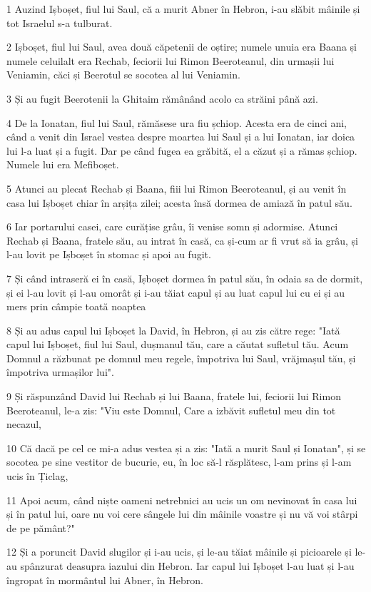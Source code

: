 \par 1 Auzind Ișboșet, fiul lui Saul, că a murit Abner în Hebron, i-au slăbit mâinile și tot Israelul s-a tulburat.
\par 2 Ișboșet, fiul lui Saul, avea două căpetenii de oștire; numele unuia era Baana și numele celuilalt era Rechab, feciorii lui Rimon Beeroteanul, din urmașii lui Veniamin, căci și Beerotul se socotea al lui Veniamin.
\par 3 Și au fugit Beerotenii la Ghitaim rămânând acolo ca străini până azi.
\par 4 De la Ionatan, fiul lui Saul, rămăsese ura fiu șchiop. Acesta era de cinci ani, când a venit din Israel vestea despre moartea lui Saul și a lui Ionatan, iar doica lui l-a luat și a fugit. Dar pe când fugea ea grăbită, el a căzut și a rămas șchiop. Numele lui era Mefiboșet.
\par 5 Atunci au plecat Rechab și Baana, fiii lui Rimon Beeroteanul, și au venit în casa lui Ișboșet chiar în arșița zilei; acesta însă dormea de amiază în patul său.
\par 6 Iar portarului casei, care curățise grâu, îi venise somn și adormise. Atunci Rechab și Baana, fratele său, au intrat în casă, ca și-cum ar fi vrut să ia grâu, și l-au lovit pe Ișboșet în stomac și apoi au fugit.
\par 7 Și când intraseră ei în casă, Ișboșet dormea în patul său, în odaia sa de dormit, și ei l-au lovit și l-au omorât și i-au tăiat capul și au luat capul lui cu ei și au mers prin câmpie toată noaptea
\par 8 Și au adus capul lui Ișboșet la David, în Hebron, și au zis către rege: "Iată capul lui Ișboșet, fiul lui Saul, dușmanul tău, care a căutat sufletul tău. Acum Domnul a răzbunat pe domnul meu regele, împotriva lui Saul, vrăjmașul tău, și împotriva urmașilor lui".
\par 9 Și răspunzând David lui Rechab și lui Baana, fratele lui, feciorii lui Rimon Beeroteanul, le-a zis: "Viu este Domnul, Care a izbăvit sufletul meu din tot necazul,
\par 10 Că dacă pe cel ce mi-a adus vestea și a zis: "Iată a murit Saul și Ionatan", și se socotea pe sine vestitor de bucurie, eu, în loc să-l răsplătesc, l-am prins și l-am ucis în Țiclag,
\par 11 Apoi acum, când niște oameni netrebnici au ucis un om nevinovat în casa lui și în patul lui, oare nu voi cere sângele lui din mâinile voastre și nu vă voi stârpi de pe pământ?"
\par 12 Și a poruncit David slugilor și i-au ucis, și le-au tăiat mâinile și picioarele și le-au spânzurat deasupra iazului din Hebron. Iar capul lui Ișboșet l-au luat și l-au îngropat în mormântul lui Abner, în Hebron.


